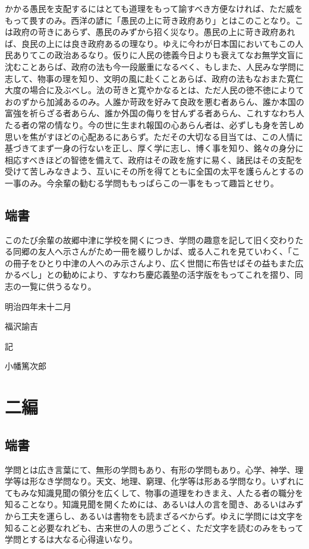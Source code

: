 \documentclass[a4paper, platex, dvipdfmx]{jsarticle}
\begin{document}
かかる愚民を支配するにはとても道理をもって諭すべき方便なければ、ただ威をもって畏すのみ。西洋の諺に「愚民の上に苛き政府あり」とはこのことなり。こは政府の苛きにあらず、愚民のみずから招く災なり。愚民の上に苛き政府あれば、良民の上には良き政府あるの理なり。ゆえに今わが日本国においてもこの人民ありてこの政治あるなり。仮りに人民の徳義今日よりも衰えてなお無学文盲に沈むことあらば、政府の法も今一段厳重になるべく、もしまた、人民みな学問に志して、物事の理を知り、文明の風に赴くことあらば、政府の法もなおまた寛仁大度の場合に及ぶべし。法の苛きと寛やかなるとは、ただ人民の徳不徳によりておのずから加減あるのみ。人誰か苛政を好みて良政を悪む者あらん、誰か本国の富強を祈らざる者あらん、誰か外国の侮りを甘んずる者あらん、これすなわち人たる者の常の情なり。今の世に生まれ報国の心あらん者は、必ずしも身を苦しめ思いを焦がすほどの心配あるにあらず。ただその大切なる目当ては、この人情に基づきてまず一身の行ないを正し、厚く学に志し、博く事を知り、銘々の身分に相応すべきほどの智徳を備えて、政府はその政を施すに易く、諸民はその支配を受けて苦しみなきよう、互いにその所を得てともに全国の太平を護らんとするの一事のみ。今余輩の勧むる学問ももっぱらこの一事をもって趣旨とせり。

\subsection{端書}
このたび余輩の故郷中津に学校を開くにつき、学問の趣意を記して旧く交わりたる同郷の友人へ示さんがため一冊を綴りしかば、或る人これを見ていわく、「この冊子をひとり中津の人へのみ示さんより、広く世間に布告せばその益もまた広かるべし」との勧めにより、すなわち慶応義塾の活字版をもってこれを摺り、同志の一覧に供うるなり。

明治四年未十二月

\begin{flushright}
福沢諭吉　　

記

小幡篤次郎　
\end{flushright}

\section{二編}
\subsection{端書}
学問とは広き言葉にて、無形の学問もあり、有形の学問もあり。心学、神学、理学等は形なき学問なり。天文、地理、窮理、化学等は形ある学問なり。いずれにてもみな知識見聞の領分を広くして、物事の道理をわきまえ、人たる者の職分を知ることなり。知識見聞を開くためには、あるいは人の言を聞き、あるいはみずから工夫を運らし、あるいは書物をも読まざるべからず。ゆえに学問には文字を知ること必要なれども、古来世の人の思うごとく、ただ文字を読むのみをもって学問とするは大なる心得違いなり。
\end{document}
